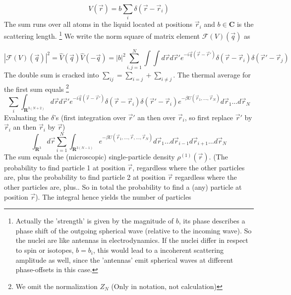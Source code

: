 \documentclass[11pt,a4paper]{article}
\begin{document}
\begin{equation}
V(\vec r) = b \sum_{i} \delta(\vec r - \vec r_i)
\end{equation}
The sum runs over all atoms in the liquid located at positions $\vec r_i$ and $b \in \mathbf{C}$ is the scattering length.
\footnote{Actually the 'strength' is given by the magnitude of $b$, its phase describes a phase shift of the outgoing 
spherical wave (relative to the incoming wave). So the nuclei are like antennas in electrodynamics. If the nuclei differ in
respect to spin or isotopes, $b=b_i$, this would lead to a incoherent scattering amplitude as well, since the 'antennas' 
emit spherical waves at different phase-offsets in this case.} 
We write the norm square of matrix element $\mathcal{F} (V) (\vec q)$ as

\begin{equation}
|\mathcal{F} (V) (\vec q)|^2 = 
\hat V (\vec q) \hat V (- \vec q) =
|b|^2 \sum_{i,j = 1}^{N} \int \int d \vec r d \vec r'
e^{- i \vec q(\vec r - \vec r')} \delta(\vec r - \vec r_i) \delta(\vec r' - \vec r_j)
\end{equation}
The double sum is cracked into $\sum_{ij} = \sum_{i=j} + \sum_{i \ne j}$. The thermal average for the first sum equals
\footnote{We omit the normalization $Z_N$ (Only in notation, not calculation)}
\begin{equation}
\sum_{i} \int_{\mathbf{R}^{3(N +2)} } d \vec r d \vec r'
e^{- i \vec q(\vec r - \vec r')} \delta(\vec r - \vec r_i) \delta(\vec r' - \vec r_i)
e^{-\beta U(\vec r_1, \dots, \vec r_N)} d \vec r_1  \dots d \vec r_N
\end{equation}
Evaluating the $\delta$'s (first integration over $\vec r'$ an then over $\vec r_i$, so first replace $\vec r'$ by $\vec r_i$
an then $\vec r_i$ by $\vec r$)
\begin{equation}
\int_{\mathbf{R}^{3}} d \vec r \sum_{i=1}^{N} \int_{\mathbf{R}^{3(N -1)} }
e^{-\beta U(\vec r_1, \dots, \vec r , \dots, \vec r_N)} d \vec r_1  \dots d\vec r_{i-1} d\vec r_{i+1} \dots d \vec r_N
\end{equation}
The sum equals the (microscopic) single-particle density $\rho^{(1)}(\vec r)$. (The probability to find particle 1 at position $\vec r$,
regardless where the other particles are, plus the probability to find particle 2 at position $\vec r$ regardless where the other particles are,
plus.. So in total the probability to find a (any) particle at position $\vec r$).
The integral hence yields the number of particles
\end{document}
